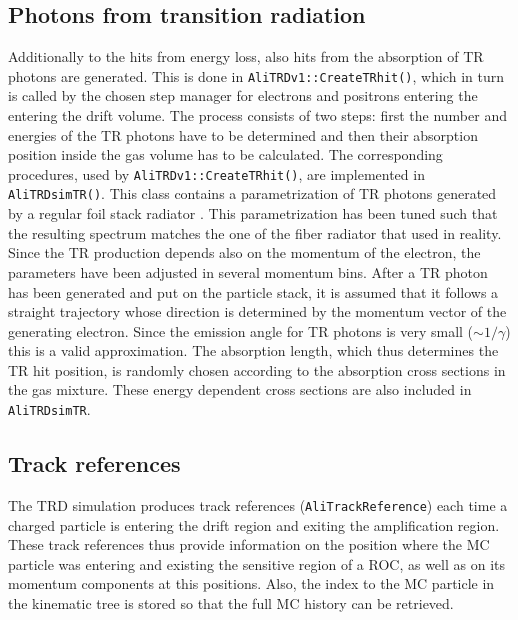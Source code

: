 \documentclass{alicetdr}
\begin{document}
\subsection{Photons from transition radiation}
%
Additionally to the hits from energy loss, also hits from the absorption of
TR photons are generated.  This is done in {\tt AliTRDv1::CreateTRhit()}, which
in turn is called by the chosen step manager for electrons and positrons
entering the entering the drift volume.  The process consists of two steps:
first the number and energies of the TR photons have to be determined and then
their absorption position inside the gas volume has to be calculated.  The
corresponding procedures, used by {\tt AliTRDv1::CreateTRhit()}, are 
implemented in {\tt AliTRDsimTR()}.  This class contains a parametrization
of TR photons generated by a regular foil stack radiator \cite{TRPHOT}.  This
parametrization has been tuned such that the resulting spectrum matches the
one of the fiber radiator that used in reality.  Since the TR production
depends also on the momentum of the electron, the parameters have been 
adjusted in several momentum bins.  After a TR photon has been generated and put
on the particle stack, it is assumed that it follows a straight trajectory 
whose direction is determined by the momentum vector of the generating electron.  
Since the emission angle for TR photons is very small ($\sim 1/\gamma$) this 
is a valid approximation.  The absorption length, which thus determines the 
TR hit position, is randomly chosen according to the absorption cross sections
in the gas mixture.  These energy dependent cross sections are also included
in {\tt AliTRDsimTR}.
%
\subsection{Track references}
%
The TRD simulation produces track references ({\tt AliTrackReference}) each time 
a charged particle is entering the drift region and exiting the amplification 
region.  These track references thus provide information on the position where 
the MC particle was entering and existing the sensitive region of a ROC, as well
as on its momentum components at this positions.  Also, the index to the MC particle
in the kinematic tree is stored so that the full MC history can be retrieved.
%
\end{document}
